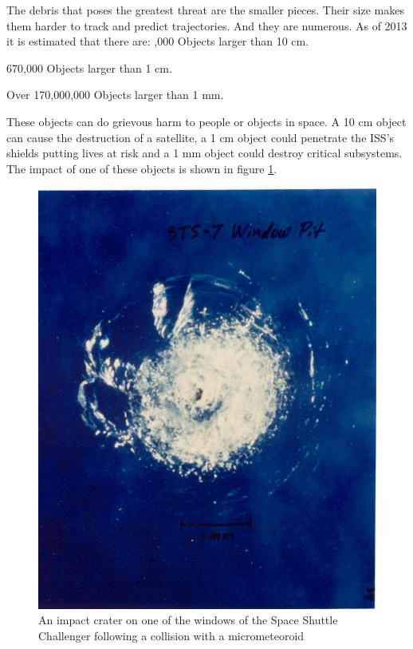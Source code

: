 \documentclass[12pt]{report}
\begin{document}
	The debris that poses the greatest threat are the smaller pieces. Their size makes them harder to track and predict trajectories. And they are numerous. As of 2013 it is estimated that there are:
	\newline
	,000 Objects larger than 10 cm.\newline
	
	670,000 Objects larger than 1 cm.\newline
	
	Over 170,000,000 Objects larger than 1 mm.\newline 
	\doublespacing
	
	These objects can do grievous harm to people or objects in space. A 10 cm object can cause the destruction of a satellite, a 1 cm object could penetrate the ISS's shields putting lives at risk and a 1 mm object could destroy critical subsystems.\cite{sdor2014} The impact of one of these objects is shown in figure \ref{fig:sts7crack}.
	
	
	
	\begin{figure}
		\centering
		\includegraphics[width=0.7\linewidth]{sts7crack}
		\caption{An impact crater on one of the windows of the Space Shuttle Challenger following a collision with a micrometeoroid\cite{stscrack}}
		\label{fig:sts7crack}
	\end{figure}
\end{document}
